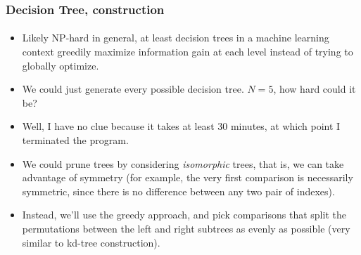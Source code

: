 \documentclass{beamer}                             %
\begin{document}
\begin{frame}
\frametitle{Decision Tree, construction}
\framesubtitle{}
\begin{itemize}[<+->]
  \item Likely NP-hard in general, at least decision trees in
    a machine learning context greedily maximize information
    gain at each level instead of trying to globally optimize.
  \item We could just generate every possible decision
    tree. \( N = 5 \), how hard could it be?
  \item Well, I have no clue because it takes at least
    30 minutes, at which point I terminated the program.
  \item We could prune trees by considering \textit{isomorphic}
    trees, that is, we can take advantage of symmetry (for example,
    the very first comparison is necessarily symmetric, since there
    is no difference between any two pair of indexes).
  \item Instead, we'll use the greedy approach, and pick comparisons
    that split the permutations between the left and right subtrees
    as evenly as possible (very similar to kd-tree construction).
\end{itemize}
\end{frame}
\end{document}
